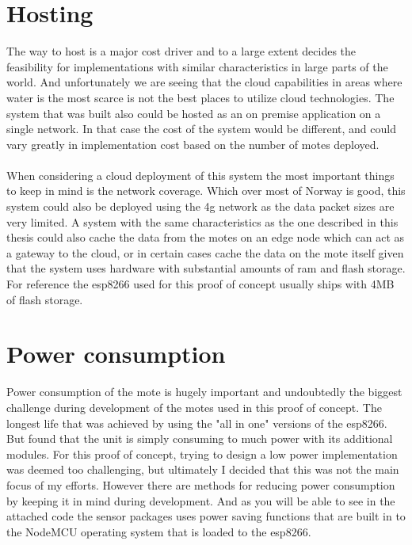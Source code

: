 \documentclass[]{uiophd}
\begin{document}
\section{Hosting}
The way to host is a major cost driver and to a large extent decides the feasibility for implementations with similar characteristics in large parts of the world. And unfortunately we are seeing that the cloud capabilities in areas where water is the most scarce is not the best places to utilize cloud technologies. The system that was built also could be hosted as an on premise application on a single network. In that case the cost of the system would be different, and could vary greatly in implementation cost based on the number of motes deployed.
\\\\
When considering a cloud deployment of this system the most important things to keep in mind is the network coverage. Which over most of Norway is good, this system could also be deployed using the 4g network as the data packet sizes are very limited. A system with the same characteristics as the one described in this thesis could also cache the data from the motes on an edge node which can act as a gateway to the cloud, or in certain cases cache the data on the mote itself given that the system uses hardware with substantial amounts of ram and flash storage. For reference the esp8266 used for this proof of concept usually ships with 4MB of flash storage. \cite{espressif}
\section{Power consumption}
Power consumption of the mote is hugely important and undoubtedly the biggest challenge during development of the motes used in this proof of concept. The longest life that was achieved by using the "all in one" versions of the esp8266. But found that the unit is simply consuming to much power with its additional modules. For this proof of concept, trying to design a low power implementation was deemed too challenging, but ultimately I decided that this was not the main focus of my efforts. However there are methods for reducing power consumption by keeping it in mind during development. And as you will be able to see in the attached code the sensor packages uses power saving functions that are built in to the NodeMCU operating system that is loaded to the esp8266.
\end{document}
